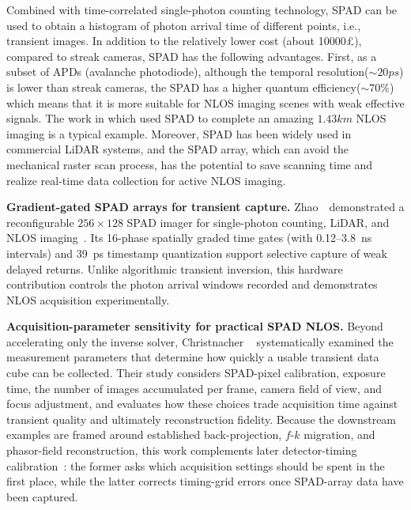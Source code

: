 Combined with time-correlated single-photon counting technology, SPAD can be used to obtain a histogram of photon arrival time of different points, i.e., transient images. In addition to the relatively lower cost (about 10000\pounds), compared to streak cameras, SPAD has the following advantages. First, as a subset of APDs (avalanche photodiode), although the temporal resolution($\sim 20ps$) is lower than streak cameras, the SPAD has a higher quantum efficiency($\sim 70\%$) which means that it is more suitable for NLOS imaging scenes with weak effective signals. The work in \cite{wuNonLineofsightImaging2021} which used SPAD to complete an amazing $1.43 km$ NLOS imaging is a typical example. 
Moreover, SPAD has been widely used in commercial LiDAR systems, and the SPAD array, which can avoid the mechanical raster scan process, has the potential to save scanning time and realize real-time data collection for active NLOS imaging.

\vspace{0.8mm}
\noindent \textbf{Gradient-gated SPAD arrays for transient capture.}
Zhao~\etal~demonstrated a reconfigurable $256\times128$ SPAD imager for single-photon counting, LiDAR, and NLOS imaging~\cite{zhaoGradientGatingSPAD2025}. Its 16-phase spatially graded time gates (with 0.12--3.8~ns intervals) and 39~ps timestamp quantization support selective capture of weak delayed returns. Unlike algorithmic transient inversion, this hardware contribution controls the photon arrival windows recorded and demonstrates NLOS acquisition experimentally.

\vspace{0.8mm}
\noindent \textbf{Acquisition-parameter sensitivity for practical SPAD NLOS.}
Beyond accelerating only the inverse solver, Christnacher \etal~\cite{christnacherAcquisitionParametersNLOS2025} systematically examined the measurement parameters that determine how quickly a usable transient data cube can be collected. Their study considers SPAD-pixel calibration, exposure time, the number of images accumulated per frame, camera field of view, and focus adjustment, and evaluates how these choices trade acquisition time against transient quality and ultimately reconstruction fidelity. Because the downstream examples are framed around established back-projection, $f$-$k$ migration, and phasor-field reconstruction, this work complements later detector-timing calibration~\cite{spaettSPADTimingNLOS2026}: the former asks which acquisition settings should be spent in the first place, while the latter corrects timing-grid errors once SPAD-array data have been captured.



